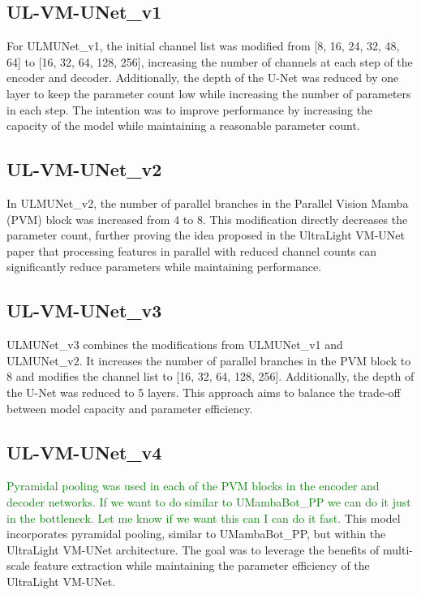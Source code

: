 \documentclass[conference]{IEEEtran}
\newcommand{\gr}[1]{\textcolor{green}{#1}}
\begin{document}

\subsection{UL-VM-UNet\_v1}
For ULMUNet\_v1, the initial channel list was modified from [8, 16, 24, 32, 48, 64] to [16, 32, 64, 128, 256], increasing the number of channels at each step of the encoder and decoder. Additionally, the depth of the U-Net was reduced by one layer to keep the parameter count low while increasing the number of parameters in each step. The intention was to improve performance by increasing the capacity of the model while maintaining a reasonable parameter count.

\subsection{UL-VM-UNet\_v2}
In ULMUNet\_v2, the number of parallel branches in the Parallel Vision Mamba (PVM) block was increased from 4 to 8. This modification directly decreases the parameter count, further proving the idea proposed in the UltraLight VM-UNet paper \cite{ultralightvmunet} that processing features in parallel with reduced channel counts can significantly reduce parameters while maintaining performance.

\subsection{UL-VM-UNet\_v3}
ULMUNet\_v3 combines the modifications from ULMUNet\_v1 and ULMUNet\_v2. It increases the number of parallel branches in the PVM block to 8 and modifies the channel list to [16, 32, 64, 128, 256]. Additionally, the depth of the U-Net was reduced to 5 layers. This approach aims to balance the trade-off between model capacity and parameter efficiency.

\subsection{UL-VM-UNet\_v4}
\gr{Pyramidal pooling was used in each of the PVM blocks in the encoder and decoder networks. If we want to do similar to UMambaBot\_PP we can do it just in the bottleneck. Let me know if we want this can I can do it fast.}
This model incorporates pyramidal pooling, similar to UMambaBot\_PP, but within the UltraLight VM-UNet architecture. The goal was to leverage the benefits of multi-scale feature extraction while maintaining the parameter efficiency of the UltraLight VM-UNet.
\end{document}
